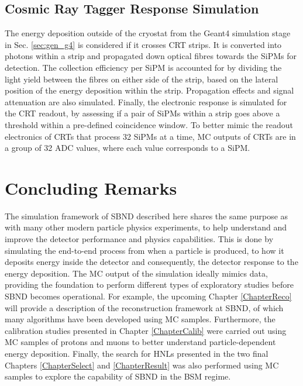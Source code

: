 \subsection{Cosmic Ray Tagger Response Simulation}
\label{sec:crt_response}

The energy deposition outside of the cryostat from the Geant4 simulation stage in Sec. \ref{sec:gen_g4} is considered if it crosses CRT strips.
It is converted into photons within a strip and propagated down optical fibres towards the SiPMs for detection.
The collection efficiency per SiPM is accounted for by dividing the light yield between the fibres on either side of the strip, based on the lateral position of the energy deposition within the strip.
Propagation effects and signal attenuation are also simulated.
Finally, the electronic response is simulated for the CRT readout, by assessing if a pair of SiPMs within a strip goes above a threshold within a pre-defined coincidence window.
To better mimic the readout electronics of CRTs that process 32 SiPMs at a time, MC outputs of CRTs are in a group of 32 ADC values, where each value corresponds to a SiPM.

\section{Concluding Remarks}
\label{sec:sim_concluding_remarks}

The simulation framework of SBND described here shares the same purpose as with many other modern particle physics experiments, to help understand and improve the detector performance and physics capabilities.
This is done by simulating the end-to-end process from when a particle is produced, to how it deposits energy inside the detector and consequently, the detector response to the energy deposition.
The MC output of the simulation ideally mimics data, providing the foundation to perform different types of exploratory studies before SBND becomes operational.
For example, the upcoming Chapter \ref{ChapterReco} will provide a description of the reconstruction framework at SBND, of which many algorithms have been developed using MC samples.
Furthermore, the calibration studies presented in Chapter \ref{ChapterCalib} were carried out using MC samples of protons and muons to better understand particle-dependent energy deposition.
Finally, the search for HNLs presented in the two final Chapters \ref{ChapterSelect} and \ref{ChapterResult} was also performed using MC samples to explore the capability of SBND in the BSM regime.

